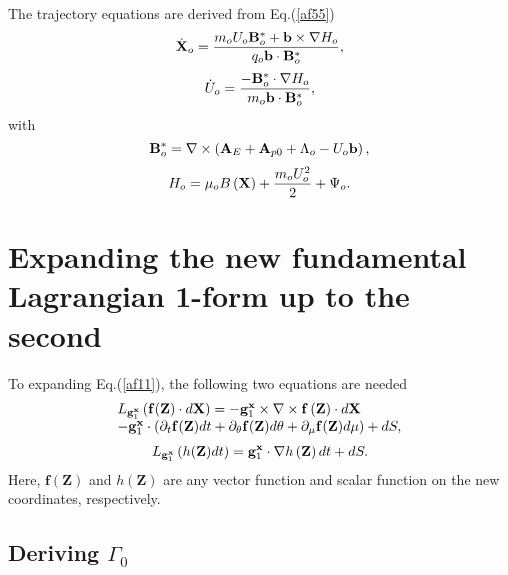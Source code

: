 \documentclass[12pt]{iopart}
\begin{document}
The trajectory equations are derived from Eq.(\ref{af55})
\begin{equation}\label{af59}
\dot{\mathbf{X}}_o= \frac{{{m_o}{U_o}{\bf{B}}_o^* + {\bf{b}} \times \nabla {H_o}}}{{{q_o}{\bf{b}}\cdot{\bf{B}}_o^*}},
\end{equation}
\begin{equation}\label{af60}
{{\dot U}_o} = \frac{{ - {\bf{B}}_o^*\cdot\nabla {H_o}}}{{{m_o}{\bf{b}}\cdot{\bf{B}}_o^*}},
\end{equation}
with
\begin{equation}\label{af61}
{\bf{B}}_o^* = \nabla  \times \left( {{{\bf{A}}_E} + {{\bf{A}}_{p0}} + {\Lambda _o} - {U_o}{\bf{b}}} \right),
\end{equation}
\begin{equation}\label{af62}
{H_o} = {\mu _o}B\left( {\bf{X}} \right) + \frac{{{m_o}U_o^2}}{2} + {\Psi _o}.
\end{equation}

\appendix

\section{Expanding the new fundamental Lagrangian 1-form up to the second}\label{app1}

To expanding Eq.(\ref{af11}), the following two equations are needed
\begin{equation}\label{af14}
\begin{array}{l}
{L_{{\bf{g}}_1^{\bf{x}}}}\left( {{\bf{f}}({\bf{Z}})\cdot d{\bf{X}}} \right) =  - {\bf{g}}_1^{\bf{x}} \times \nabla  \times {\bf{f}}\left( {\bf{Z}} \right)\cdot d{\bf{X}}\\
 - {\bf{g}}_1^{\bf{x}}\cdot\left( {{\partial _t}{\bf{f}}({\bf{Z}})dt + {\partial _\theta }{\bf{f}}({\bf{Z}})d\theta  + {\partial _\mu }{\bf{f}}({\bf{Z}})d\mu } \right) + dS,
\end{array}
\end{equation}
\begin{equation}\label{af15}
{L_{{\bf{g}}_1^{\bf{x}}}}\left( {h({\bf{Z}})dt} \right) = {\bf{g}}_1^{\bf{x}}\cdot\nabla h\left( {\bf{Z}} \right)dt+dS.
\end{equation}
Here, $\mathbf{f}(\mathbf{Z})$ and $h(\mathbf{Z})$ are any vector function and scalar function on the new coordinates, respectively.

\subsection{Deriving $\Gamma_0$}
\end{document}
